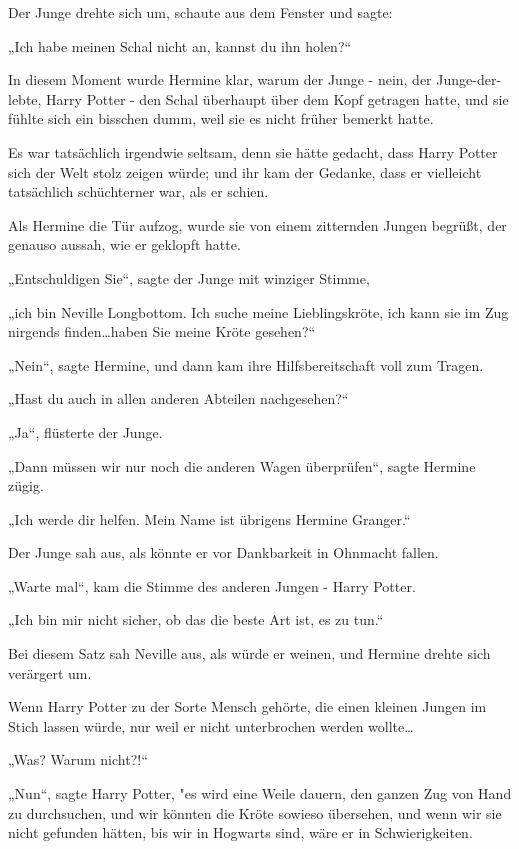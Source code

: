 {Der Junge drehte sich um, schaute aus dem Fenster und sagte:

„Ich habe meinen Schal nicht an, kannst du ihn holen?“

In diesem Moment wurde Hermine klar, warum der Junge - nein, der Junge-der-lebte, Harry Potter - den Schal überhaupt über dem Kopf getragen hatte, und sie fühlte sich ein bisschen dumm, weil sie es nicht früher bemerkt hatte.

Es war tatsächlich irgendwie seltsam, denn sie hätte gedacht, dass Harry Potter sich der Welt stolz zeigen würde; und ihr kam der Gedanke, dass er vielleicht tatsächlich schüchterner war, als er schien.

Als Hermine die Tür aufzog, wurde sie von einem zitternden Jungen begrüßt, der genauso aussah, wie er geklopft hatte.

„Entschuldigen Sie“, sagte der Junge mit winziger Stimme,

„ich bin Neville Longbottom. Ich suche meine Lieblingskröte, ich kann sie im Zug nirgends finden…haben Sie meine Kröte gesehen?“

„Nein“, sagte Hermine, und dann kam ihre Hilfsbereitschaft voll zum Tragen.

„Hast du auch in allen anderen Abteilen nachgesehen?“

„Ja“, flüsterte der Junge.

„Dann müssen wir nur noch die anderen Wagen überprüfen“, sagte Hermine zügig.

„Ich werde dir helfen. Mein Name ist übrigens Hermine Granger.“

Der Junge sah aus, als könnte er vor Dankbarkeit in Ohnmacht fallen.

„Warte mal“, kam die Stimme des anderen Jungen - Harry Potter.

„Ich bin mir nicht sicher, ob das die beste Art ist, es zu tun.“

Bei diesem Satz sah Neville aus, als würde er weinen, und Hermine drehte sich verärgert um.

Wenn Harry Potter zu der Sorte Mensch gehörte, die einen kleinen Jungen im Stich lassen würde, nur weil er nicht unterbrochen werden wollte…

„Was? Warum nicht?!“

„Nun“, sagte Harry Potter, "es wird eine Weile dauern, den ganzen Zug von Hand zu durchsuchen, und wir könnten die Kröte sowieso übersehen, und wenn wir sie nicht gefunden hätten, bis wir in Hogwarts sind, wäre er in Schwierigkeiten.

}
